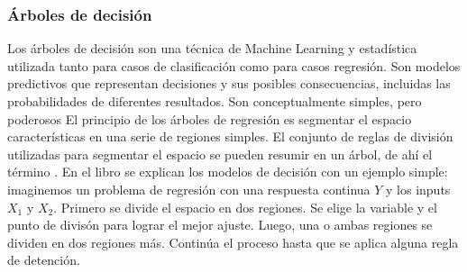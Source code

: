 \documentclass[12pt,a4paper,Spanish]{article}
\begin{document}
\subsubsection{Árboles de decisión}\label{decision_tree}
Los árboles de decisión son una técnica de Machine Learning y estadística utilizada tanto para casos de clasificación como para casos regresión. Son modelos predictivos que representan decisiones y sus posibles consecuencias, incluidas las probabilidades de diferentes resultados. Son conceptualmente simples, pero poderosos
\newline
El principio de los árboles de regresión es segmentar el espacio características en una serie de regiones simples. El conjunto de reglas de división utilizadas para segmentar el espacio se pueden resumir en un árbol, de ahí el término \cite{gareth2013introduction}.
\newline
En el libro  se explican los modelos de decisión con un ejemplo simple: imaginemos un problema de regresión con una respuesta continua $Y$ y los inputs $X_1$ y $X_2$. Primero se divide el espacio en dos regiones. Se elige la variable y el punto de divisón para lograr el mejor ajuste. Luego, una o ambas regiones se dividen en dos regiones más. Continúa el proceso hasta que se aplica alguna regla de detención.
\end{document}
